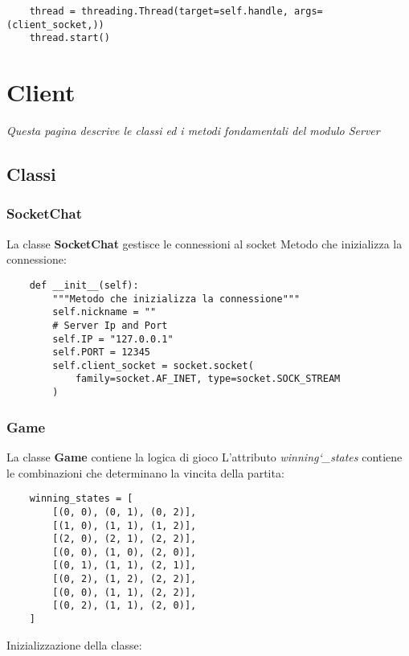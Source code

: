 \documentclass{article}
\begin{document}
\begin{verbatim}
    thread = threading.Thread(target=self.handle, args=(client_socket,))
    thread.start()
\end{verbatim}

\section{Client}
\emph{Questa pagina descrive le classi ed i metodi fondamentali del modulo Server}

\subsection{Classi}

\subsubsection{SocketChat}
La classe \textbf{SocketChat} gestisce le connessioni al socket
\newline\newline
Metodo che inizializza la connessione:

\begin{verbatim}
    def __init__(self):
        """Metodo che inizializza la connessione"""
        self.nickname = ""
        # Server Ip and Port
        self.IP = "127.0.0.1"
        self.PORT = 12345
        self.client_socket = socket.socket(
            family=socket.AF_INET, type=socket.SOCK_STREAM
        )
\end{verbatim}

\subsubsection{Game}
La classe \textbf{Game} contiene la logica di gioco
\newline\newline
L'attributo \emph{winning\char`_states} contiene le combinazioni che determinano la vincita della partita:

\begin{verbatim}
    winning_states = [
        [(0, 0), (0, 1), (0, 2)],
        [(1, 0), (1, 1), (1, 2)],
        [(2, 0), (2, 1), (2, 2)],
        [(0, 0), (1, 0), (2, 0)],
        [(0, 1), (1, 1), (2, 1)],
        [(0, 2), (1, 2), (2, 2)],
        [(0, 0), (1, 1), (2, 2)],
        [(0, 2), (1, 1), (2, 0)],
    ]
\end{verbatim}

Inizializzazione della classe:
\end{document}

